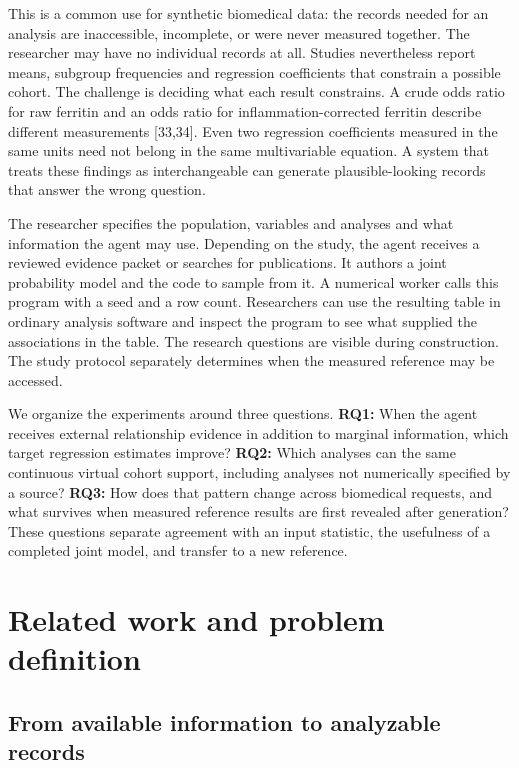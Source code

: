 \documentclass[sigconf,review]{acmart}
\begin{document}
This is a common use for synthetic biomedical data: the records needed for an analysis are inaccessible, incomplete, or were never measured together. The researcher may have no individual records at all. Studies nevertheless report means, subgroup frequencies and regression coefficients that constrain a possible cohort. The challenge is deciding what each result constrains. A crude odds ratio for raw ferritin and an odds ratio for inflammation-corrected ferritin describe different measurements [33,34]. Even two regression coefficients measured in the same units need not belong in the same multivariable equation. A system that treats these findings as interchangeable can generate plausible-looking records that answer the wrong question.


The researcher specifies the population, variables and analyses and what information the agent may use. Depending on the study, the agent receives a reviewed evidence packet or searches for publications. It authors a joint probability model and the code to sample from it. A numerical worker calls this program with a seed and a row count. Researchers can use the resulting table in ordinary analysis software and inspect the program to see what supplied the associations in the table. The research questions are visible during construction. The study protocol separately determines when the measured reference may be accessed.


We organize the experiments around three questions. \textbf{RQ1:} When the agent receives external relationship evidence in addition to marginal information, which target regression estimates improve? \textbf{RQ2:} Which analyses can the same continuous virtual cohort support, including analyses not numerically specified by a source? \textbf{RQ3:} How does that pattern change across biomedical requests, and what survives when measured reference results are first revealed after generation? These questions separate agreement with an input statistic, the usefulness of a completed joint model, and transfer to a new reference.


\section{Related work and problem definition}

\subsection{From available information to analyzable records}
\end{document}
